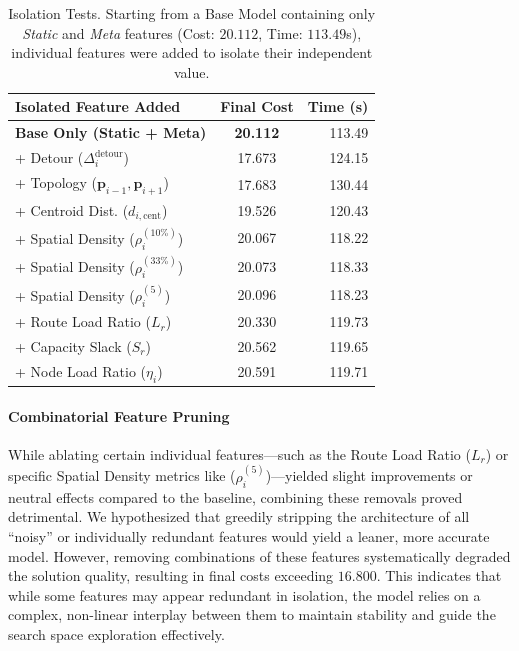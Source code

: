 \documentclass[letterpaper]{article} %
\begin{document}
\begin{table}[t]

\centering

\small

\caption{Isolation Tests. Starting from a Base Model containing only \textit{Static} and \textit{Meta} features (Cost: $20.112$, Time: $113.49$s), individual features were added to isolate their independent value.}
\label{tab:isolation_ablation}
\begin{tabular}{l c r}
\toprule
\textbf{Isolated Feature Added} & \textbf{Final Cost} & \textbf{Time (s)} \\
\midrule
\textbf{Base Only (Static + Meta)} & \textbf{20.112} & 113.49 \\
\midrule
+ Detour ($\Delta^{\text{detour}}_i$) & 17.673 & 124.15 \\
+ Topology ($\mathbf{p}_{i-1}, \mathbf{p}_{i+1}$) & 17.683 & 130.44 \\
+ Centroid Dist. ($d_{i, \text{cent}}$) & 19.526 & 120.43 \\
+ Spatial Density ($\rho^{(10\%)}_i$) & 20.067 & 118.22 \\
+ Spatial Density ($\rho^{(33\%)}_i$) & 20.073 & 118.33 \\
+ Spatial Density ($\rho^{(5)}_i$) & 20.096 & 118.23 \\
+ Route Load Ratio ($L_r$) & 20.330 & 119.73 \\
+ Capacity Slack ($S_r$) & 20.562 & 119.65 \\
+ Node Load Ratio ($\eta_i$) & 20.591 & 119.71 \\
\bottomrule
\end{tabular}
\end{table}

\paragraph{Combinatorial Feature Pruning}
While ablating certain individual features---such as the Route Load Ratio ($L_r$) or specific Spatial Density metrics like ($\rho^{(5)}_i$)---yielded slight improvements or neutral effects compared to the baseline, combining these removals proved detrimental. We hypothesized that greedily stripping the architecture of all ``noisy'' or individually redundant features would yield a leaner, more accurate model. However, removing combinations of these features systematically degraded the solution quality, resulting in final costs exceeding $16.800$. This indicates that while some features may appear redundant in isolation, the model relies on a complex, non-linear interplay between them to maintain stability and guide the search space exploration effectively.
\end{document}
